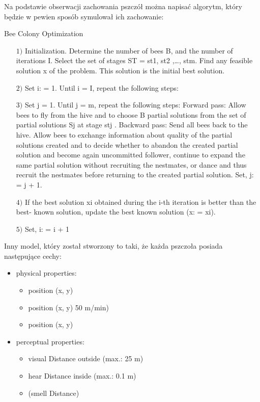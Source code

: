 \documentclass[11pt]{aghdpl}
\begin{document}
\begin{enumerate}
Na podstawie obserwacji zachowania pszczół można napisać algorytm, który będzie w pewien sposób symulował ich zachowanie:

Bee Colony Optimization
\begin{enumerate}
        \item[$1)$] Initialization. Determine the number of bees B, and the number of iterations I. Select the set of stages ST = {st1, st2 ,…, stm}. Find any feasible solution x of the problem. This solution is the initial best solution.
        \item[$2)$] Set i: = 1. Until i = I, repeat the following steps:
        \item[$3)$] Set j = 1. Until j = m, repeat the following steps:
                Forward pass: Allow bees to fly from the hive and to choose B partial solutions from the set of partial solutions Sj at stage stj .
                Backward pass: Send all bees back to the hive.
                Allow bees to exchange information about quality of the partial solutions created and to decide whether to abandon the created partial solution and become again uncommitted follower, continue to expand the same partial solution without recruiting the nestmates, or dance and thus recruit the nestmates before returning to the created partial solution. Set, j: = j + 1.
        \item[$4)$] If the best solution xi obtained during the i-th iteration is better than the best- known solution, update the best known solution (x: = xi).
        \item[$5)$] Set, i: = i + 1
\end{enumerate}

Inny model, który został stworzony to taki, że każda pszczoła posiada następujące cechy:
\begin{itemize}
\item physical properties:
        \begin{itemize}
                \item position (x, y)
                \item position (x, y) 50 m/min)
                \item position (x, y)
        \end{itemize}
\item perceptual properties:
        \begin{itemize}
                \item visual Distance outside (max.: 25 m)
                \item hear Distance inside (max.: 0.1 m)
                \item (smell Distance)
        \end{itemize}


\end{itemize}
\end{enumerate}
\end{document}
